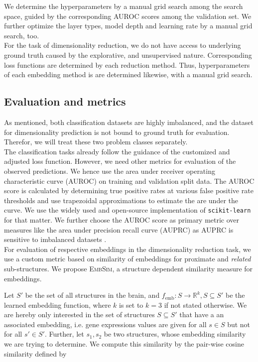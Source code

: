 \documentclass[]{article}
\renewcommand{\cite}{\citep}
\begin{document}
We determine the hyperparameters by a manual grid search among the search space, guided by the corresponding AUROC scores among the validation set. We further optimize the layer types, model depth and learning rate by a manual grid search, too.\\

For the task of dimensionality reduction, we do not have access to underlying ground truth caused by the explorative, and unsupervised nature. Corresponding loss functions are determined by each reduction method.
Thus, hyperparameters of each embedding method is are determined likewise, with a manual grid search.

\subsection{Evaluation and metrics}
\label{sec:evalmetrics}

As mentioned, both classification datasets are highly imbalanced, and the dataset for dimensionality prediction is not bound to ground truth for evaluation. Therefor, we will treat these two problem classes separately.\\

The classification tasks already follow the guidance of the customized and adjusted loss function. However, we need other metrics for evaluation of the observed predictions. We hence use the area under receiver operating characteristic curve (AUROC) on training and validation split data.
The AUROC score is calculated by determining true positive rates at various false positive rate thresholds and use trapezoidal approximations to estimate the are under the curve. We use the widely used and open-source implementation of \verb*|scikit-learn| for that matter. We further choose the AUROC score as primary metric over measures like the area under precision recall curve (AUPRC) as AUPRC is sensitive to imbalanced datasets \cite{jeni2013facing}.\\

For evaluation of respective embeddings in the dimensionality reduction task, we use a custom metric based on similarity of embeddings for proximate and \textit{related} sub-structures. We propose \textsc{EmbSim}, a structure dependent similarity measure for embeddings. 

Let $S'$ be the set of all structures in the brain, and $f_{\text{emb}}:S\rightarrow \mathbb{R}^k ,S\subseteq S'$ be the learned embedding function, where $k$ is set to $k=3$ if not stated otherwise. We are hereby only interested in the set of structures $S\subseteq S'$ that have a an associated embedding, i.e. gene expressions values are given for all $s\in S$ but not for all $s'\in S'$. 
Further, let $s_1, s_2$ be two structures, whose embedding similarity we are trying to determine. We compute this similarity by the pair-wise cosine similarity defined by 
\end{document}
